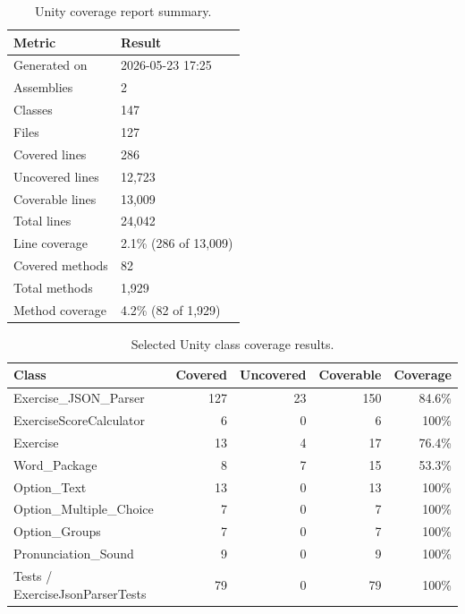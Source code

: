 \begin{table}[H]
    \centering
    \caption{Unity coverage report summary.}
    \label{tab:unity-coverage-summary}
    \begin{tabular}{ll}
        \toprule
        \textbf{Metric} & \textbf{Result} \\
        \midrule
        Generated on & 2026-05-23 17:25 \\
        Assemblies & 2 \\
        Classes & 147 \\
        Files & 127 \\
        Covered lines & 286 \\
        Uncovered lines & 12,723 \\
        Coverable lines & 13,009 \\
        Total lines & 24,042 \\
        Line coverage & 2.1\% (286 of 13,009) \\
        Covered methods & 82 \\
        Total methods & 1,929 \\
        Method coverage & 4.2\% (82 of 1,929) \\
        \bottomrule
    \end{tabular}
\end{table}

\begin{table}[H]
    \centering
    \caption{Selected Unity class coverage results.}
    \label{tab:unity-selected-coverage}
    \begin{tabular}{lrrrr}
        \toprule
        \textbf{Class} & \textbf{Covered} & \textbf{Uncovered} & \textbf{Coverable} & \textbf{Coverage} \\
        \midrule
        Exercise\_JSON\_Parser & 127 & 23 & 150 & 84.6\% \\
        ExerciseScoreCalculator & 6 & 0 & 6 & 100\% \\
        Exercise & 13 & 4 & 17 & 76.4\% \\
        Word\_Package & 8 & 7 & 15 & 53.3\% \\
        Option\_Text & 13 & 0 & 13 & 100\% \\
        Option\_Multiple\_Choice & 7 & 0 & 7 & 100\% \\
        Option\_Groups & 7 & 0 & 7 & 100\% \\
        Pronunciation\_Sound & 9 & 0 & 9 & 100\% \\
        Tests / ExerciseJsonParserTests & 79 & 0 & 79 & 100\% \\
        \bottomrule
    \end{tabular}
\end{table}

